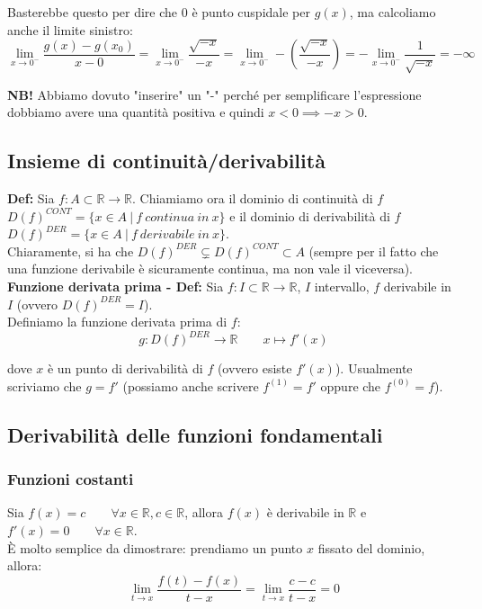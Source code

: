 \documentclass{article}
\begin{document}
\noindent Basterebbe questo per dire che $0$ è punto cuspidale per $g(x)$, ma calcoliamo anche il limite sinistro:
\begin{equation*}
    \lim_{x \to 0^-} \frac{g(x) - g(x_0)}{x - 0} = \lim_{x \to 0^-} \frac{\sqrt{-x}}{-x} = \lim_{x \to 0^-} -\left(\frac{\sqrt{-x}}{-x}\right) = - \lim_{x \to 0^-} \frac{1}{\sqrt{-x}} = -\infty
\end{equation*}

\noindent\textbf{NB!} Abbiamo dovuto "inserire" un "-" perché per semplificare l'espressione dobbiamo avere una quantità positiva e quindi $x < 0 \implies -x > 0$.

\subsection{Insieme di continuità/derivabilità}
\textbf{Def:} Sia $f: A \subset \mathbb{R} \xrightarrow{} \mathbb{R}$. Chiamiamo ora il dominio di continuità di $f$ $D(f)^{CONT} = \{x \in A \ | \ f \ continua \ in \ x \}$ e il dominio di derivabilità di $f$ $D(f)^{DER} = \{x \in A \ | \ f \ derivabile \ in \ x \}$.\\
Chiaramente, si ha che $D(f)^{DER} \subsetneq D(f)^{CONT} \subset A$ (sempre per il fatto che una funzione derivabile è sicuramente continua, ma non vale il viceversa).\\

\noindent\textbf{Funzione derivata prima - Def:} Sia $f: I \subset \mathbb{R} \xrightarrow{} \mathbb{R}$, $I$ intervallo, $f$ derivabile in $I$ (ovvero $D(f)^{DER} = I$).\\
Definiamo la funzione derivata prima di $f$: 
\begin{equation*}
    g: D(f)^{DER} \xrightarrow{} \mathbb{R} \qquad x \longmapsto f'(x)
\end{equation*}

\noindent dove $x$ è un punto di derivabilità di $f$ (ovvero esiste $f'(x)$). Usualmente scriviamo che $g = f'$ (possiamo anche scrivere $f^{(1)} = f'$ oppure che $f^{(0)} = f$).

\subsection{Derivabilità delle funzioni fondamentali}
\subsubsection{Funzioni costanti}
Sia $f(x) = c \qquad \forall x \in \mathbb{R}, c \in \mathbb{R}$, allora $f(x)$ è derivabile in $\mathbb{R}$ e $f'(x) = 0 \qquad \forall x \in \mathbb{R}$.\\
È molto semplice da dimostrare: prendiamo un punto $x$ fissato del dominio, allora:
\begin{equation*}
    \lim_{t \to x} \frac{f(t) - f(x)}{t - x} = \lim_{t \to x} \frac{c - c}{t - x} = 0
\end{equation*}
\end{document}
